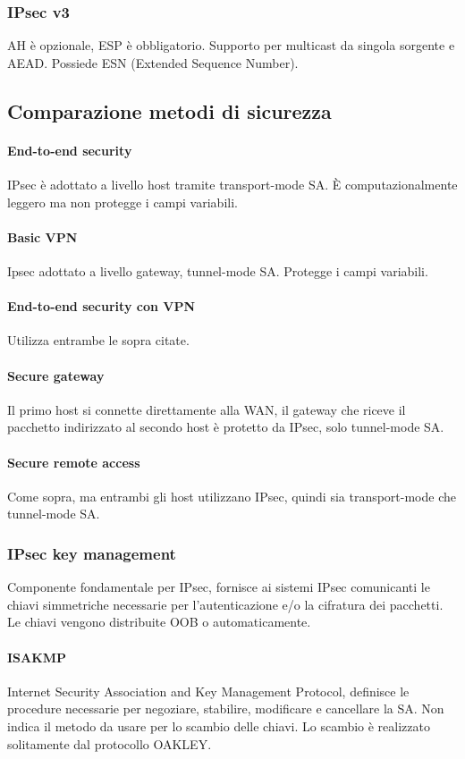 \documentclass[11pt]{article}
\begin{document}
\subsubsection{IPsec v3}
AH è opzionale, ESP è obbligatorio. Supporto per multicast da singola sorgente e AEAD. Possiede ESN (Extended Sequence Number).
\subsection{Comparazione metodi di sicurezza}
\paragraph*{End-to-end security}
IPsec è adottato a livello host tramite transport-mode SA. È computazionalmente leggero ma non protegge i campi variabili.
\paragraph*{Basic VPN}
Ipsec adottato a livello gateway, tunnel-mode SA. Protegge i campi variabili.
\paragraph*{End-to-end security con VPN}
Utilizza entrambe le sopra citate.
\paragraph*{Secure gateway}
Il primo host si connette direttamente alla WAN, il gateway che riceve il pacchetto indirizzato al secondo host è protetto 
da IPsec, solo tunnel-mode SA.
\paragraph*{Secure remote access}
Come sopra, ma entrambi gli host utilizzano IPsec, quindi sia transport-mode che tunnel-mode SA.
\subsubsection{IPsec key management}
Componente fondamentale per IPsec, fornisce ai sistemi IPsec comunicanti le chiavi simmetriche necessarie per l'autenticazione 
e/o la cifratura dei pacchetti. Le chiavi vengono distribuite OOB o automaticamente.
\paragraph*{ISAKMP}
Internet Security Association and Key Management Protocol, definisce le procedure necessarie per negoziare, stabilire, modificare 
e cancellare la SA. Non indica il metodo da usare per lo scambio delle chiavi. Lo scambio è realizzato solitamente dal 
protocollo OAKLEY.
\end{document}
